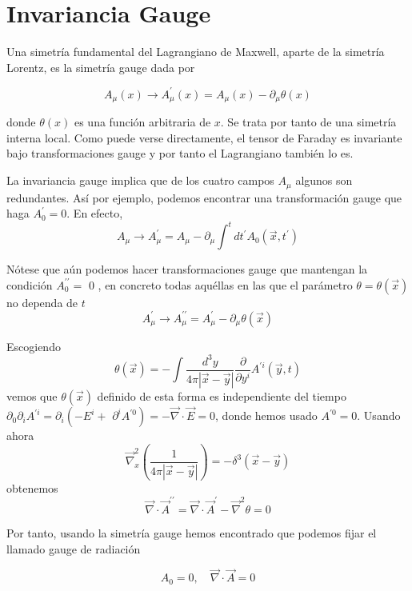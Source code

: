 \section{Invariancia Gauge}

Una simetría fundamental del Lagrangiano de Maxwell, aparte de la simetría Lorentz, es la simetría gauge dada por

\begin{equation*}
A_{\mu}(x) \rightarrow A_{\mu}^{\prime}(x)=A_{\mu}(x)-\partial_{\mu} \theta(x) \tag{6.7}
\end{equation*}

donde $\theta(x)$ es una función arbitraria de $x$. Se trata por tanto de una simetría interna local. Como puede verse directamente, el tensor de Faraday es invariante bajo transformaciones gauge y por tanto el Lagrangiano también lo es.

La invariancia gauge implica que de los cuatro campos $A_{\mu}$ algunos son redundantes. Así por ejemplo, podemos encontrar una transformación gauge que haga $A_{0}^{\prime}=0$. En efecto,
$$
A_{\mu} \rightarrow A_{\mu}^{\prime}=A_{\mu}-\partial_{\mu} \int^{t} d t^{\prime} A_{0}\left(\vec{x}, t^{\prime}\right)
$$

Nótese que aún podemos hacer transformaciones gauge que mantengan la condición $A_{0}^{\prime \prime}=$ 0 , en concreto todas aquéllas en las que el parámetro $\theta=\theta(\vec{x})$ no dependa de $t$
$$
A_{\mu}^{\prime} \rightarrow A_{\mu}^{\prime \prime}=A_{\mu}^{\prime}-\partial_{\mu} \theta(\vec{x})
$$

Escogiendo
$$
\theta(\vec{x})=-\int \frac{d^{3} y}{4 \pi|\vec{x}-\vec{y}|} \frac{\partial}{\partial y^{i}} A^{\prime i}(\vec{y}, t)
$$
vemos que $\theta(\vec{x})$ definido de esta forma es independiente del tiempo $\partial_{0} \partial_{i} A^{\prime i}=\partial_{i}\left(-E^{i}+\right.$ $\left.\partial^{i} A^{\prime 0}\right)=-\vec{\nabla} \cdot \vec{E}=0$, donde hemos usado $A^{\prime 0}=0$. Usando ahora
$$
\vec{\nabla}_{x}^{2}\left(\frac{1}{4 \pi|\vec{x}-\vec{y}|}\right)=-\delta^{3}(\vec{x}-\vec{y})
$$
obtenemos
$$
\vec{\nabla} \cdot \vec{A}^{\prime \prime}=\vec{\nabla} \cdot \vec{A}^{\prime}-\vec{\nabla}^{2} \theta=0
$$

Por tanto, usando la simetría gauge hemos encontrado que podemos fijar el llamado gauge de radiación

\begin{equation*}
A_{0}=0, \quad \vec{\nabla} \cdot \vec{A}=0 \tag{6.8}
\end{equation*}



